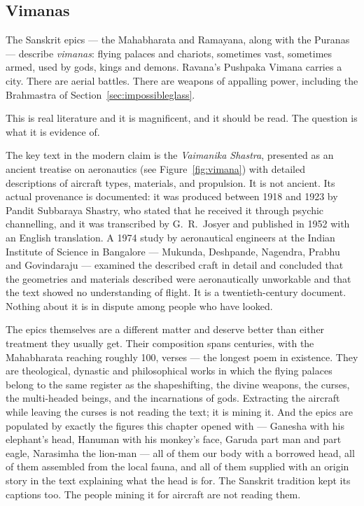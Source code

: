 \subsection{Vimanas}\label{sec:vimanas}

The Sanskrit epics --- the Mahabharata and Ramayana, along with the Puranas --- describe
\emph{vimanas}: flying palaces and chariots, sometimes vast, sometimes armed, used by gods,
kings and demons. Ravana's Pushpaka Vimana carries a city. There are aerial battles. There are
weapons of appalling power, including the Brahmastra of Section~\ref{sec:impossibleglass}.

This is real literature and it is magnificent, and it should be read. The question is what it is
evidence of.

The key text in the modern claim is the \emph{Vaimanika Shastra}, presented as an ancient treatise on aeronautics (see Figure~\ref{fig:vimana}) with detailed descriptions of aircraft types, materials, and
propulsion. It is not ancient. Its actual provenance is documented: it was produced between
1918 and 1923 by Pandit Subbaraya Shastry, who stated that he received it through psychic
channelling, and it was transcribed by G.~R.~Josyer and published in 1952 with an English
translation. A 1974 study by aeronautical engineers at the Indian Institute of Science in
Bangalore --- Mukunda, Deshpande, Nagendra, Prabhu and Govindaraju --- examined the described
craft in detail and concluded that the geometries and materials described were aeronautically
unworkable and that the text showed no understanding of flight. It is a twentieth-century
document. Nothing about it is in dispute among people who have looked.

The epics themselves are a different matter and deserve better than either treatment they
usually get. Their composition spans centuries, with the Mahabharata reaching roughly 100,
verses --- the longest poem in existence. They are theological, dynastic and philosophical works
in which the flying palaces belong to the same register as the shapeshifting, the divine
weapons, the curses, the multi-headed beings, and the incarnations of gods. Extracting the
aircraft while leaving the curses is not reading the text; it is mining it. And the epics are
populated by exactly the figures this chapter opened with --- Ganesha with his elephant's head,
Hanuman with his monkey's face, Garuda part man and part eagle, Narasimha the lion-man --- all of
them our body with a borrowed head, all of them assembled from the local fauna, and all of them
supplied with an origin story in the text explaining what the head is for. The Sanskrit tradition
kept its captions too. The people mining it for aircraft are not reading them.

